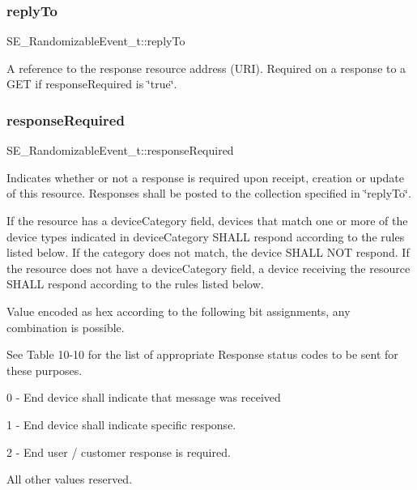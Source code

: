 \subsubsection{\texorpdfstring{reply\+To}{replyTo}}
{\footnotesize\ttfamily S\+E\+\_\+\+Randomizable\+Event\+\_\+t\+::reply\+To}

A reference to the response resource address (U\+RI). Required on a response to a G\+ET if response\+Required is \char`\"{}true\char`\"{}. \mbox{\label{group__RandomizableEvent_ga20fb6d1e039d742368e1025e2103aeab}} 
\subsubsection{\texorpdfstring{response\+Required}{responseRequired}}
{\footnotesize\ttfamily S\+E\+\_\+\+Randomizable\+Event\+\_\+t\+::response\+Required}

Indicates whether or not a response is required upon receipt, creation or update of this resource. Responses shall be posted to the collection specified in \char`\"{}reply\+To\char`\"{}.

If the resource has a device\+Category field, devices that match one or more of the device types indicated in device\+Category S\+H\+A\+LL respond according to the rules listed below. If the category does not match, the device S\+H\+A\+LL N\+OT respond. If the resource does not have a device\+Category field, a device receiving the resource S\+H\+A\+LL respond according to the rules listed below.

Value encoded as hex according to the following bit assignments, any combination is possible.

See Table 10-\/10 for the list of appropriate Response status codes to be sent for these purposes.

0 -\/ End device shall indicate that message was received

1 -\/ End device shall indicate specific response.

2 -\/ End user / customer response is required.

All other values reserved. \mbox{\label{group__RandomizableEvent_gaed50030cccbadde5ca606e7eb27cf4dd}} 
